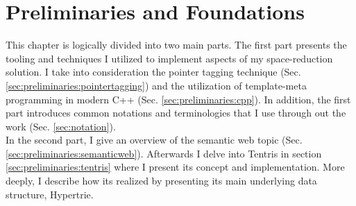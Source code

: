 \chapter{Preliminaries and Foundations}
\label{ch:preliminaries}

This chapter is logically divided into two main parts. The first part presents the tooling and techniques I utilized to implement aspects of my space-reduction solution. I take into consideration the pointer tagging technique (Sec. \ref{sec:preliminaries:pointertagging}) and the utilization of template-meta programming in modern C++ (Sec. \ref{sec:preliminaries:cpp}). In addition, the first part introduces common notations and terminologies that I  use through out the work (Sec. \ref{sec:notation}). \\ 

In the second part, I give an overview of the semantic web topic (Sec. \ref{sec:preliminaries:semanticweb}). Afterwards I delve into Tentris in section \ref{sec:preliminaries:tentris} where I present its concept and implementation. More deeply, I describe how its realized by presenting its main underlying data structure, Hypertrie. 





